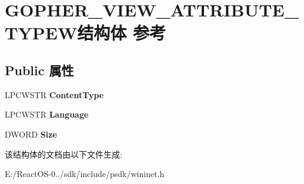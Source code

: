 \hypertarget{struct_g_o_p_h_e_r___v_i_e_w___a_t_t_r_i_b_u_t_e___t_y_p_e_w}{}\section{G\+O\+P\+H\+E\+R\+\_\+\+V\+I\+E\+W\+\_\+\+A\+T\+T\+R\+I\+B\+U\+T\+E\+\_\+\+T\+Y\+P\+E\+W结构体 参考}
\label{struct_g_o_p_h_e_r___v_i_e_w___a_t_t_r_i_b_u_t_e___t_y_p_e_w}
\subsection*{Public 属性}
\begin{DoxyCompactItemize}
\item 
\mbox{\label{struct_g_o_p_h_e_r___v_i_e_w___a_t_t_r_i_b_u_t_e___t_y_p_e_w_a43cb78625efe6b4f7ccda3794856d94f}} 
L\+P\+C\+W\+S\+TR {\bfseries Content\+Type}
\item 
\mbox{\label{struct_g_o_p_h_e_r___v_i_e_w___a_t_t_r_i_b_u_t_e___t_y_p_e_w_aa3b3de66edfc6ec663af4226970a6c3b}} 
L\+P\+C\+W\+S\+TR {\bfseries Language}
\item 
\mbox{\label{struct_g_o_p_h_e_r___v_i_e_w___a_t_t_r_i_b_u_t_e___t_y_p_e_w_ad046191ab9c2f837e6ae5c8aaaefc7fd}} 
D\+W\+O\+RD {\bfseries Size}
\end{DoxyCompactItemize}


该结构体的文档由以下文件生成\+:\begin{DoxyCompactItemize}
\item 
E\+:/\+React\+O\+S-\/0../sdk/include/psdk/wininet.\+h\end{DoxyCompactItemize}
